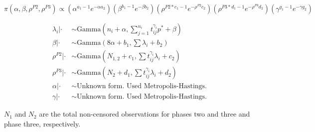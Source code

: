 \documentclass[12pt]{article}
\begin{document}
\begin{equation*}
\pi(\alpha, \beta, \rho^{P2}, \rho^{P3}) \propto (\alpha^{a_1-1}e^{-\alpha
  a_2})(\beta^{b_1 - 1}e^{-\beta b_2})(\rho^{P2*c_1 - 1}e^{-\rho^{P2}
  c_2})(\rho^{P3 * d_1 - 1}e^{-\rho^{P3} d_2})(\gamma^{g_1 - 1}e^{-\gamma g_2})
\end{equation*}

\begin{align*}
\lambda_i|\cdot &\sim \text{Gamma}(n_i + \alpha, \sum_{j=1}^{n_i}t_{ij}^{\gamma_i} p^* + \beta) \\
\beta|\cdot &\sim \text{Gamma}(8\alpha + b_1, \sum{\lambda_i} + b_2) \\
\rho^{P2}|\cdot &\sim \text{Gamma}(N_{1,2} + c_1, \sum{t_{ij}^{\gamma_i} \lambda_i} + c_2) \\
\rho^{P3}|\cdot &\sim \text{Gamma}(N_{2} + d_1, \sum{t_{ij}^{\gamma_i} \lambda_i} + d_2) \\
\alpha|\cdot &\sim \text{Unknown form.  Used Metropolis-Hastings.}\\
\gamma|\cdot &\sim \text{Unknown form.  Used Metropolis-Hastings.}
\end{align*}

$N_1$ and $N_2$ are the total non-censored observations for phases two and three
and phase three, respectively.
\end{document}
